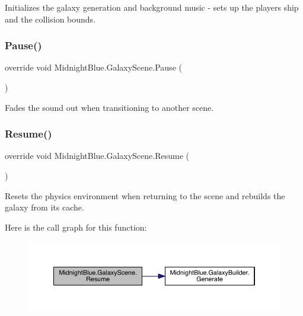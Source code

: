 Initializes the galaxy generation and background music -\/ sets up the players ship and the collision bounds. 

\hypertarget{class_midnight_blue_1_1_galaxy_scene_aeb44afaeda2cccd225e64908bb76bee4}{}\label{class_midnight_blue_1_1_galaxy_scene_aeb44afaeda2cccd225e64908bb76bee4} 
\subsubsection{\texorpdfstring{Pause()}{Pause()}}
{\footnotesize\ttfamily override void Midnight\+Blue.\+Galaxy\+Scene.\+Pause (\begin{DoxyParamCaption}{ }\end{DoxyParamCaption})\hspace{0.3cm}{\ttfamily [inline]}}



Fades the sound out when transitioning to another scene. 

\hypertarget{class_midnight_blue_1_1_galaxy_scene_ab641e6727cdb64dc6487e9a229521692}{}\label{class_midnight_blue_1_1_galaxy_scene_ab641e6727cdb64dc6487e9a229521692} 
\subsubsection{\texorpdfstring{Resume()}{Resume()}}
{\footnotesize\ttfamily override void Midnight\+Blue.\+Galaxy\+Scene.\+Resume (\begin{DoxyParamCaption}{ }\end{DoxyParamCaption})\hspace{0.3cm}{\ttfamily [inline]}}



Resets the physics environment when returning to the scene and rebuilds the galaxy from its cache. 

Here is the call graph for this function\+:
\nopagebreak
\begin{figure}[H]
\begin{center}
\leavevmode
\includegraphics[width=350pt]{class_midnight_blue_1_1_galaxy_scene_ab641e6727cdb64dc6487e9a229521692_cgraph}
\end{center}
\end{figure}
\hypertarget{class_midnight_blue_1_1_galaxy_scene_a9dfa66406143ed20f4d534c768f05a78}{}\label{class_midnight_blue_1_1_galaxy_scene_a9dfa66406143ed20f4d534c768f05a78} 

